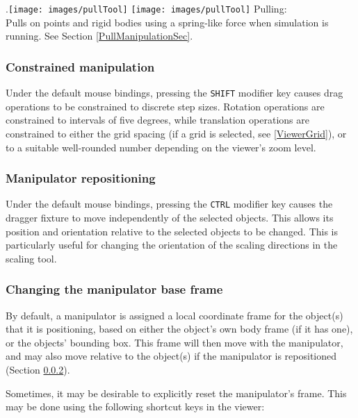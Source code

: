 \documentclass{article}
\begin{document}
\vspace{\parskip}
\iflatexml
.\texttt{[image: images/pullTool]}
\else
\texttt{[image: images/pullTool]}
\fi
{\sf Pulling:}\\
Pulls on points and rigid bodies using a spring-like force
when simulation is running. See Section \ref{PullManipulationSec}.


\subsubsection{Constrained manipulation}

Under the default mouse bindings, pressing the {\tt SHIFT} modifier
key causes drag operations to be constrained to discrete step sizes.
Rotation operations are constrained to
intervals of five degrees, while translation operations are
constrained to either the grid spacing (if a grid is selected, see
\ref{ViewerGrid}), or to a suitable well-rounded number depending on
the viewer's zoom level.

\subsubsection{Manipulator repositioning}
\label{ChangingManipulatorPose}

Under the default mouse bindings, pressing the {\tt CTRL} modifier key
causes the dragger fixture to move independently of the selected
objects. This allows its position and orientation
relative to the selected objects to be changed. This is particularly
useful for changing the orientation of the scaling directions in the
scaling tool.

\subsubsection{Changing the manipulator base frame}

By default, a manipulator is assigned a local coordinate frame for the
object(s) that it is positioning, based on either the object's own
body frame (if it has one), or the objects' bounding box. This frame
will then move with the manipulator, and may also move relative to the
object(s) if the manipulator is repositioned (Section
\ref{ChangingManipulatorPose}).

Sometimes, it may be desirable to explicitly reset the manipulator's
frame. This may be done using the following shortcut keys in the
viewer:
\end{document}
